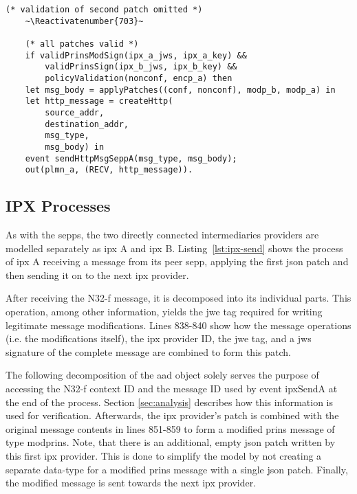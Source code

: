 \begin{lstlisting}[caption={Definition of the receiving N32-f signaling transmission process},label={lst:n32f-recv},firstnumber=833]
    (* validation of second patch omitted *)
    ~\Reactivatenumber{703}~

    (* all patches valid *)
    if validPrinsModSign(ipx_a_jws, ipx_a_key) &&
        validPrinsSign(ipx_b_jws, ipx_b_key) &&
        policyValidation(nonconf, encp_a) then
    let msg_body = applyPatches((conf, nonconf), modp_b, modp_a) in
    let http_message = createHttp(
        source_addr,
        destination_addr,
        msg_type,
        msg_body) in
    event sendHttpMsgSeppA(msg_type, msg_body);
    out(plmn_a, (RECV, http_message)).
\end{lstlisting}

\subsection{IPX Processes}

As with the \glspl{sepp}, the two directly connected intermediaries providers are modelled separately as \gls{ipx} A and \gls{ipx} B.
Listing~\ref{lst:ipx-send} shows the process of \gls{ipx} A receiving a message from its peer \gls{sepp}, applying the first \gls{json} patch and then sending it on to the next \gls{ipx} provider.

After receiving the N32-f message, it is decomposed into its individual parts.
This operation, among other information, yields the \gls{jwe} tag required for writing legitimate message modifications.
Lines 838-840 show how the message operations (i.e. the modifications itself), the \gls{ipx} provider ID, the \gls{jwe} tag, and a \gls{jws} signature of the complete message are combined to form this patch.

The following decomposition of the \gls{aad} object solely serves the purpose of accessing the N32-f context ID and the message ID used by event {\sffamily ipxSendA} at the end of the process.
Section \ref{sec:analysis} describes how this information is used for verification.
Afterwards, the \gls{ipx} provider's patch is combined with the original message contents in lines 851-859 to form a modified \gls{prins} message of type {\sffamily modprins}.
Note, that there is an additional, empty \gls{json} patch written by this first \gls{ipx} provider.
This is done to simplify the model by not creating a separate data-type for a modified \gls{prins} message with a single \gls{json} patch.
Finally, the modified message is sent towards the next \gls{ipx} provider.


